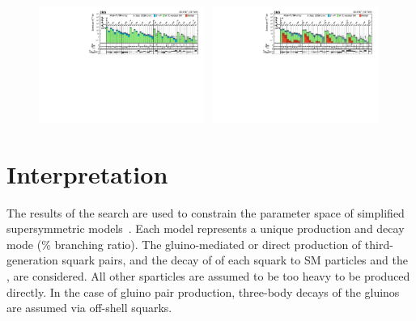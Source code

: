 \begin{figure}[!t]
\begin{center}
    \includegraphics[width=0.48\textwidth, trim=10 0 60 10, clip=true]{figures/5jet_cr-only.pdf}~
    \includegraphics[width=0.48\textwidth, trim=10 0 60 10, clip=true]{figures/6jet_cr-only.pdf}\\
    \label{fig:mono}
  \end{center}
\end{figure}


\clearpage
\section{Interpretation}
\label{sec:interpretations}

The results of the search are used to constrain the parameter space of
simplified supersymmetric models~\cite{Alwall:2008ag, Alwall:2008va,
  sms}. Each model represents a unique production and decay mode (\% branching ratio). The gluino-mediated or direct production of
third-generation squark pairs, and the decay of of each squark to SM
particles and the \chiz, are considered. All other sparticles are
assumed to be too heavy to be produced directly. In the case of gluino
pair production, three-body decays of the gluinos are assumed via
off-shell squarks.

